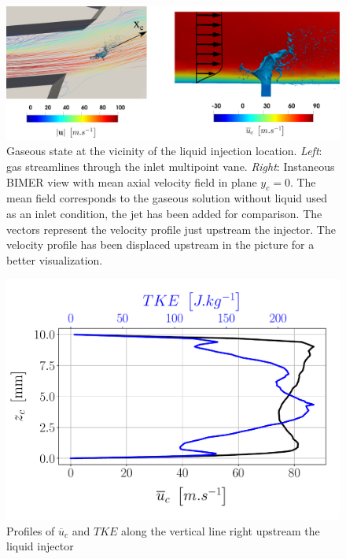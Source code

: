 \begin{figure}[ht]
\centering
\includegraphics[scale=0.225]{./part3_applications/figures_ch8_resolved/gaseous_profile_streamlines_and_vector}
\caption[Gaseous state at the vicinity of the liquid injection location]{Gaseous state at the vicinity of the liquid injection location. \textsl{Left}: gas streamlines through the inlet multipoint vane.  \textsl{Right}: Instaneous BIMER view with mean axial velocity field in plane $y_c = 0$. The mean field corresponds to the gaseous solution without liquid used as an inlet condition, the jet has been added for comparison. The vectors represent the velocity profile just upstream the injector. The velocity profile has been displaced upstream in the picture for a better visualization.}
\label{fig:BIMER_Umean_profile_with_jet}
\end{figure}



\begin{figure}[ht]
\centering
	\centering
   \includegraphics[scale=0.4]{./part3_applications/figures_ch8_resolved/gas_inlet_profiles}
   \vspace*{-0.15in}
   \caption{Profiles of $\overline{u}_c$ and $TKE$ along the vertical line right upstream the liquid injector}
\label{fig:BIMER_gas_inlet_profiles}
\end{figure}




